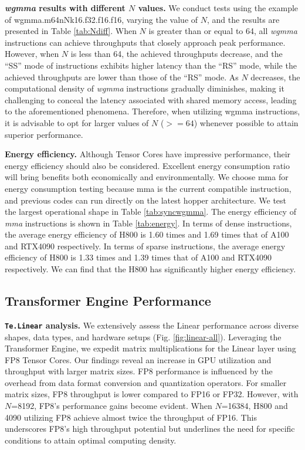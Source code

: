 \textbf{\emph{wgmma} results with different $N$ values.} We conduct tests using the example of wgmma.m64nNk16.f32.f16.f16, varying the value of $N$, and the results are presented in Table \ref{tab:Ndiff}. When $N$ is greater than or equal to 64, all \emph{wgmma} instructions can achieve throughputs that closely approach peak performance. However, when $N$ is less than 64, the achieved throughputs decrease, and the ``SS'' mode of instructions exhibits higher latency than the ``RS'' mode, while the achieved throughputs are lower than those of the ``RS'' mode. As $N$ decreases, the computational density of \emph{wgmma} instructions gradually diminishes, making it challenging to conceal the latency associated with shared memory access, leading to the aforementioned phenomena. Therefore, when utilizing wgmma instructions, it is advisable to opt for larger values of $N$ ($>=64$) whenever possible to attain superior performance.

\textbf{Energy efficiency.} Although Tensor Cores have impressive performance, their energy efficiency should also be considered. Excellent energy consumption ratio will bring benefits both economically and environmentally. We choose mma for energy consumption testing because mma is the current compatible instruction, and previous codes can run directly on the latest hopper architecture. We test the largest operational shape in Table \ref{tab:syncwgmma}. The energy efficiency of \emph{mma} instructions is shown in Table \ref{tab:energy}. In terms of dense instructions, the average energy efficiency of H800 is 1.60 times and 1.69 times that of A100 and RTX4090 respectively. In terms of sparse instructions, the average energy efficiency of H800 is 1.33 times and 1.39 times that of A100 and RTX4090 respectively. We can find that the H800 has significantly higher energy efficiency.

\subsection{Transformer Engine Performance}
\textbf{\texttt{Te.Linear} analysis.} We extensively assess the Linear performance across diverse shapes, data types, and hardware setups (Fig. \ref{fig:linear-all}). Leveraging the Transformer Engine, we expedit matrix multiplications for the Linear layer using FP8 Tensor Cores. Our findings reveal an increase in GPU utilization and throughput with larger matrix sizes. FP8 performance is influenced by the overhead from data format conversion and quantization operators. For smaller matrix sizes, FP8 throughput is lower compared to FP16 or FP32. However, with $N$=8192, FP8's performance gains become evident. When $N$=16384, H800 and 4090 utilizing FP8 achieve almost twice the throughput of FP16. This underscores FP8's high throughput potential but underlines the need for specific conditions to attain optimal computing density.

